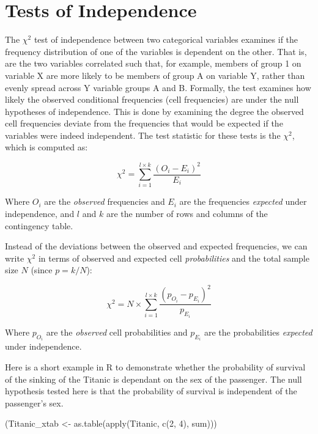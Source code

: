 \documentclass[mathematics,article,submit,moreauthors,pdftex]{mdpi}
\newenvironment{Shaded}{\begin{snugshade}}{\end{snugshade}}
\newcommand{\DecValTok}[1]{\textcolor[rgb]{0.00,0.00,0.81}{#1}}
\newcommand{\FunctionTok}[1]{\textcolor[rgb]{0.00,0.00,0.00}{#1}}
\newcommand{\NormalTok}[1]{#1}
\newcommand{\OtherTok}[1]{\textcolor[rgb]{0.56,0.35,0.01}{#1}}
\begin{document}
\hypertarget{tests-of-independence}{%
\section{Tests of Independence}\label{tests-of-independence}}

The \(\chi^2\) test of independence between two categorical variables
examines if the frequency distribution of one of the variables is
dependent on the other. That is, are the two variables correlated such
that, for example, members of group 1 on variable X are more likely to
be members of group A on variable Y, rather than evenly spread across Y
variable groups A and B. Formally, the test examines how likely the
observed conditional frequencies (cell frequencies) are under the null
hypotheses of independence. This is done by examining the degree the
observed cell frequencies deviate from the frequencies that would be
expected if the variables were indeed independent. The test statistic
for these tests is the \(\chi^2\), which is computed as:

\[
\chi^2 = \sum_{i=1}^{l\times k}{\frac{(O_i-E_i)^2}{E_i}}
\]

Where \(O_i\) are the \emph{observed} frequencies and \(E_i\) are the
frequencies \emph{expected} under independence, and \(l\) and \(k\) are
the number of rows and columns of the contingency table.

Instead of the deviations between the observed and expected frequencies,
we can write \(\chi^2\) in terms of observed and expected cell
\emph{probabilities} and the total sample size \(N\) (since \(p=k/N\)):

\[
\chi^2 = N\times\sum_{i=1}^{l\times k}{\frac{(p_{O_i}-p_{E_i})^2}{p_{E_i}}}
\]

Where \(p_{O_i}\) are the \emph{observed} cell probabilities and
\(p_{E_i}\) are the probabilities \emph{expected} under independence.

Here is a short example in R to demonstrate whether the probability of
survival of the sinking of the Titanic is dependant on the sex of the
passenger. The null hypothesis tested here is that the probability of
survival is independent of the passenger's sex.

\begin{Shaded}
\begin{Highlighting}[]
\NormalTok{(Titanic\_xtab }\OtherTok{\textless{}{-}} \FunctionTok{as.table}\NormalTok{(}\FunctionTok{apply}\NormalTok{(Titanic, }\FunctionTok{c}\NormalTok{(}\DecValTok{2}\NormalTok{, }\DecValTok{4}\NormalTok{), sum)))}
\end{Highlighting}
\end{Shaded}
\end{document}
